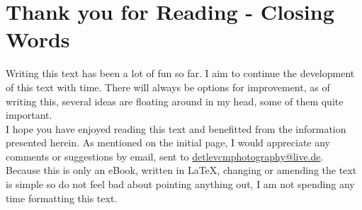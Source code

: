 \chapter{Thank you for Reading - Closing Words}

Writing this text has been a lot of fun so far. I aim to continue the development of this text with time. There will always be options for improvement, as of writing this, several ideas are floating around in my head, some of them quite important.
\\[\baselineskip]
I hope you have enjoyed reading this text and benefitted from the information presented herein. As mentioned on the initial page, I would appreciate any comments or suggestions by email, sent to \href{mailto:detlevcmphotography@live.de}{detlevcmphotography@live.de}.
\\[\baselineskip]
Because this is only an eBook, written in LaTeX, changing or amending the text is simple so do not feel bad about pointing anything out, I am not spending any time formatting this text.
